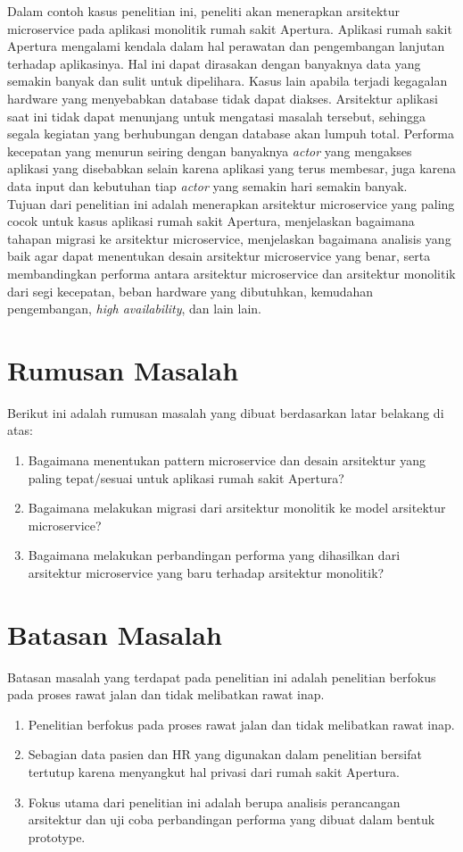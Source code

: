 Dalam contoh kasus penelitian ini, peneliti akan menerapkan arsitektur microservice pada aplikasi monolitik rumah sakit Apertura. Aplikasi rumah sakit Apertura mengalami kendala dalam hal perawatan dan pengembangan lanjutan terhadap aplikasinya. Hal ini dapat dirasakan dengan banyaknya data yang semakin banyak dan sulit untuk dipelihara. Kasus lain apabila terjadi kegagalan hardware yang menyebabkan database tidak dapat diakses. Arsitektur aplikasi saat ini tidak dapat menunjang untuk mengatasi masalah tersebut, sehingga segala kegiatan yang berhubungan dengan database akan lumpuh total. Performa kecepatan yang menurun seiring dengan banyaknya \textit{actor} yang mengakses aplikasi yang disebabkan selain karena aplikasi yang terus membesar, juga karena data input dan kebutuhan tiap \textit{actor} yang semakin hari semakin banyak.\\
Tujuan dari penelitian ini adalah menerapkan arsitektur microservice yang paling cocok untuk kasus aplikasi rumah sakit Apertura, menjelaskan bagaimana tahapan migrasi ke arsitektur microservice, menjelaskan bagaimana analisis yang baik agar dapat menentukan desain arsitektur microservice yang benar, serta membandingkan performa antara arsitektur microservice dan arsitektur monolitik dari segi kecepatan, beban hardware yang dibutuhkan, kemudahan pengembangan, \textit{high availability}, dan lain lain.

\section{Rumusan Masalah}
Berikut ini adalah rumusan masalah yang dibuat berdasarkan latar belakang di atas:
\begin {enumerate}[nolistsep, leftmargin=0.5cm]
\item Bagaimana menentukan pattern microservice dan desain arsitektur yang paling tepat/sesuai untuk aplikasi rumah sakit Apertura?
\item Bagaimana melakukan migrasi dari arsitektur monolitik ke model arsitektur microservice?
\item Bagaimana melakukan perbandingan performa yang dihasilkan dari arsitektur microservice yang baru terhadap arsitektur monolitik?
\end{enumerate}

\section{Batasan Masalah}
Batasan masalah yang terdapat pada penelitian ini adalah penelitian berfokus pada proses rawat jalan dan tidak melibatkan rawat inap. 
\begin{enumerate}[nolistsep,leftmargin=0.5cm]
\item Penelitian berfokus pada proses rawat jalan dan tidak melibatkan rawat inap.
\item Sebagian data pasien dan HR yang digunakan dalam penelitian bersifat tertutup karena menyangkut hal privasi dari rumah sakit Apertura.
\item Fokus utama dari penelitian ini adalah berupa analisis perancangan arsitektur dan uji coba perbandingan performa yang dibuat dalam bentuk prototype. 
\end{enumerate}


